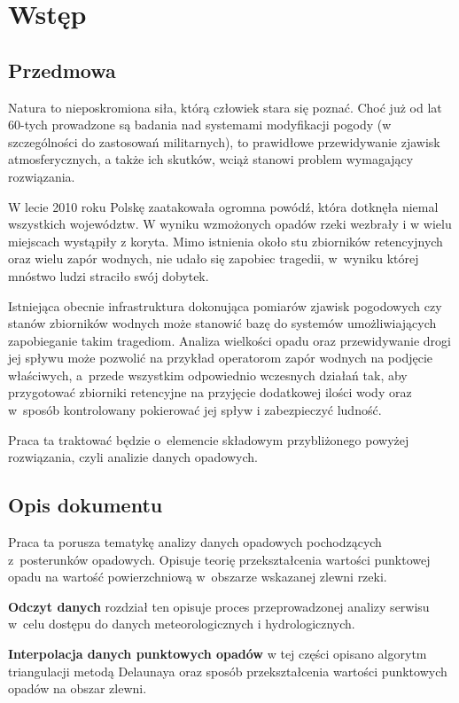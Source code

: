 \chapter{Wstęp}
\section{Przedmowa}
Natura to nieposkromiona siła, którą człowiek stara się poznać. Choć już od lat 60-tych prowadzone są badania nad systemami modyfikacji pogody (w szczególności do zastosowań militarnych), to prawidłowe przewidywanie zjawisk atmosferycznych, a także ich skutków, wciąż stanowi problem wymagający rozwiązania.

W lecie 2010 roku Polskę zaatakowała ogromna powódź, która dotknęła niemal wszystkich województw. W wyniku wzmożonych opadów rzeki wezbrały i w wielu miejscach wystąpiły z koryta. Mimo istnienia około stu zbiorników retencyjnych oraz wielu zapór wodnych, nie udało się zapobiec tragedii, w~wyniku której mnóstwo ludzi straciło swój dobytek.

Istniejąca obecnie infrastruktura dokonująca pomiarów zjawisk pogodowych czy stanów zbiorników wodnych może stanowić bazę do systemów umożliwiających zapobieganie takim tragediom. Analiza wielkości opadu oraz przewidywanie drogi jej spływu może pozwolić na przykład operatorom zapór wodnych na podjęcie właściwych, a~przede wszystkim odpowiednio wczesnych działań tak, aby przygotować zbiorniki retencyjne na przyjęcie dodatkowej ilości wody oraz w~sposób kontrolowany pokierować jej spływ i zabezpieczyć ludność.

Praca ta traktować będzie o~elemencie składowym przybliżonego powyżej rozwiązania, czyli analizie danych opadowych.

\section{Opis dokumentu}
Praca ta porusza tematykę analizy danych opadowych pochodzących z~posterunków opadowych. Opisuje teorię przekształcenia wartości punktowej opadu na wartość powierzchniową w~obszarze wskazanej zlewni rzeki.

\textbf{Odczyt danych} rozdział ten opisuje proces przeprowadzonej analizy serwisu w~celu dostępu do danych meteorologicznych i hydrologicznych.

\textbf{Interpolacja danych punktowych opadów} w tej części opisano algorytm triangulacji metodą Delaunaya oraz sposób przekształcenia wartości punktowych opadów na obszar zlewni.
